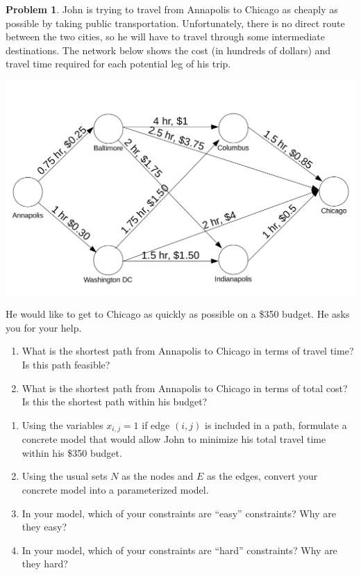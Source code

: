 \documentclass[11pt]{article}
\theoremstyle{definition}
\newtheorem{problem}{Problem}
\begin{document}
\begin{problem}
John is trying to travel from Annapolis to Chicago as cheaply as possible by taking public transportation. Unfortunately, there is no direct route between the two cities, so he will have to travel through some intermediate destinations. The network below shows the cost (in hundreds of dollars) and travel time required for each potential leg of his trip.

\begin{center}
\includegraphics[width=6in]{Short-path.png}
\end{center}

He would like to get to Chicago as quickly as possible on a \$350 budget. He asks you for your help.
\end{problem}

\begin{enumerate}
\item What is the shortest path from Annapolis to Chicago in terms of travel time? Is this path feasible? \vfill
\item What is the shortest path from Annapolis to Chicago in terms of total cost? Is this the shortest path within his budget? \vfill
\end{enumerate}

\newpage

\begin{enumerate}[resume]
\item Using the variables $x_{i,j} = 1$ if edge $(i,j)$ is included in a path, formulate a concrete model that would allow John to minimize his total travel time within his \$350 budget. 
\vfill 
\item Using the usual sets $N$ as the nodes and $E$ as the edges, convert your concrete model into a parameterized model.
\vfill
\newpage

\item In your model, which of your constraints are ``easy'' constraints? Why are they easy? \vspace{1.5cm}
\item In your  model, which of your constraints are ``hard'' constraints? Why are they hard? \vspace{1.5cm}
\end{enumerate}
\end{document}
